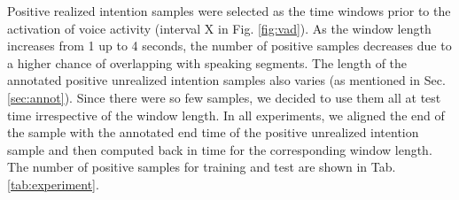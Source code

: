 \documentclass[sigconf]{acmart}
\begin{document}
Positive realized intention samples were selected as the time windows prior to the activation of voice activity (interval X in Fig. \ref{fig:vad}). As the window length increases from 1 up to 4 seconds, the number of positive samples decreases due to a higher chance of overlapping with speaking segments. The length of the annotated positive unrealized intention samples also varies (as mentioned in Sec. \ref{sec:annot}). Since there were so few samples, we decided to use them all at test time irrespective of the window length. In all experiments, we aligned the end of the sample with the annotated end time of the positive unrealized intention sample and then computed back in time for the corresponding window length. The number of positive samples for training and test are shown in Tab. \ref{tab:experiment}.






\end{document}

